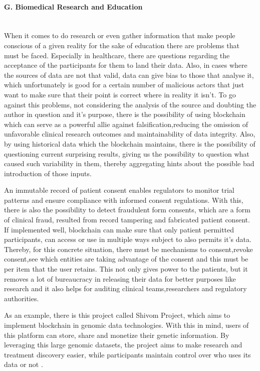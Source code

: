 \paragraph{G. Biomedical Research and Education} \mbox{}\\
When it comes to do research or even gather information that make people conscious of a given reality for the sake of education there are problems that must be faced. Especially in healthcare, there are questions regarding the acceptance of the participants for them to land their data. Also, in cases where the sources of data are not that valid, data can give bias to those that analyse it, which unfortunately is good for a certain number of malicious actors that just want to make sure that their point is correct where in reality it isn't. To go against this problems, not considering the analysis of the source and doubting the author in question and it's purpose, there is the possibility of using blockchain which can serve as a powerful allie against falsification,reducing the omission of unfavorable clinical research outcomes and maintainability of data integrity. Also, by using historical data which the blockchain maintains, there is the possibility of questioning current surprising results, giving us the possibility to question what caused such variability in them, thereby aggregating hints about the possible bad introduction of those inputs. 

An immutable record of patient consent enables regulators to monitor trial patterns and ensure compliance with informed consent regulations. With this, there is also the possibility to detect fraudulent form consents, which are a form of clinical fraud, resulted from record tampering and fabricated patient consent. If implemented well, blockchain can make sure that only patient permitted participants, can access or use in multiple ways subject to also permits it's data. Thereby, for this concrete situation, there must be mechanisms to consent,revoke consent,see which entities are taking advantage of the consent and this must be per item that the user retains. This not only gives power to the patients, but it removes a lot of bureaucracy in releasing their data for better purposes like research and it also helps for auditing clinical teams,researchers and regulatory authorities.

As an example, there is this project called Shivom Project, which aims to implement blockchain in genomic data technologies. With this in mind, users of this platform can store, share and monetize their genetic information. By leveraging this large genomic datasets, the project aims to make research and treatment discovery easier, while participants maintain control over who uses its data or not \cite{crunchbase}. 

